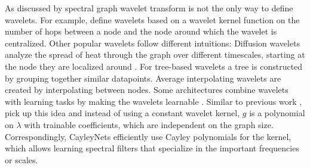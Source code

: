 \documentclass{article}
\begin{document}
As discussed by \citet{Shuman_2013} spectral graph wavelet transform is not the only way to define wavelets. For example, \citet{crovella2003graph} define wavelets based on a wavelet kernel function on the number of hops between a node and the node around which the wavelet is centralized. Other popular wavelets follow different intuitions: Diffusion wavelets \cite{coifman2006diffusion} analyze the spread of heat through the graph over different timescales, starting at the node they are localized around%
. For tree-based wavelets \cite{ram2011generalized} a tree is constructed by grouping together similar datapoints. Average interpolating wavelets \cite{rustamov2011average} are created by interpolating between nodes.
Some architectures combine wavelets with learning tasks by making the wavelets learnable \cite{gavish2010multiscale}.
Similar to previous work \cite{bruna2014spectral, henaff2015deep}, \citet{defferrard2016convolutional} pick up this idea and instead of using a constant wavelet kernel, $g$ is a polynomial on $\lambda$ with trainable coefficients, which are independent on the graph size. Correspondingly, CayleyNets \cite{levie2018cayleynets} efficiently use Cayley polynomials for the kernel, which allows learning spectral filters that specialize in the important frequencies or scales. %
\end{document}
